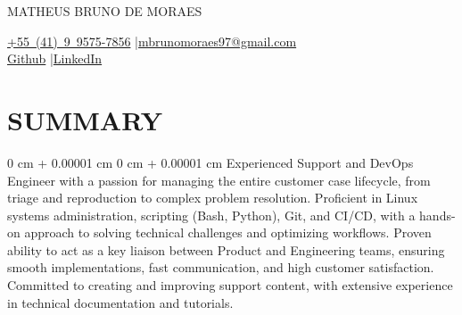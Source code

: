 \documentclass[10pt, letterpaper]{article}
\newenvironment{onecolentry}{
    \begin{adjustwidth}{
        0 cm + 0.00001 cm
    }{
        0 cm + 0.00001 cm
    }
}{
    \end{adjustwidth}
}
\newenvironment{header}{
    \setlength{\topsep}{0pt}\par\kern\topsep\centering\linespread{1.5}
}{
    \par\kern\topsep
}
\begin{document}
\begin{header}
    {\fontsize{25pt}{25pt}\selectfont MATHEUS BRUNO DE MORAES}

    \vspace{0pt}

    \normalsize
    \mbox{\href{tel:+55(41)995757856}{+55 (41) 9 9575-7856}} \enskip|\enskip \mbox{\href{mailto:mbrunomoraes97@gmail.com}{mbrunomoraes97@gmail.com}} \\
    \mbox{\href{https://github.com/brunomoraes97}{Github}} \enskip|\enskip \mbox{\href{https://www.linkedin.com/in/brunomoraes97/}{LinkedIn}}
\end{header}

\vspace{5pt - 0.1cm}

\section{SUMMARY}
\begin{onecolentry}{Experienced Support and DevOps Engineer with a passion for managing the entire customer case lifecycle, from triage and reproduction to complex problem resolution. Proficient in Linux systems administration, scripting (Bash, Python), Git, and CI/CD, with a hands-on approach to solving technical challenges and optimizing workflows. Proven ability to act as a key liaison between Product and Engineering teams, ensuring smooth implementations, fast communication, and high customer satisfaction. Committed to creating and improving support content, with extensive experience in technical documentation and tutorials.}\end{onecolentry}
\end{document}

